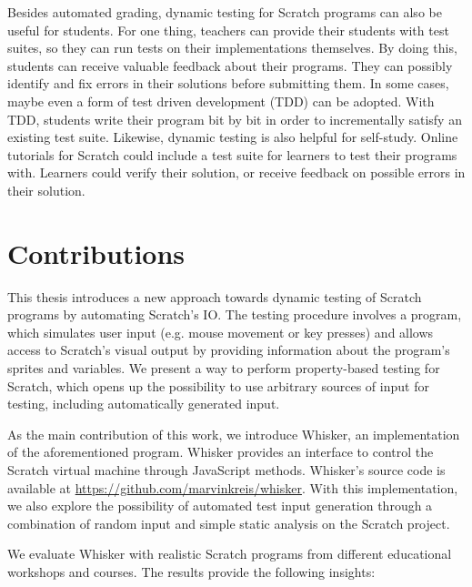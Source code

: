 Besides automated grading, dynamic testing for Scratch programs can also be useful for students.
For one thing, teachers can provide their students with test suites, so they can run tests on their implementations themselves.
By doing this, students can receive valuable feedback about their programs.
They can possibly identify and fix errors in their solutions before submitting them.
In some cases, maybe even a form of test driven development (TDD) can be adopted.
With TDD, students write their program bit by bit in order to incrementally satisfy an existing test suite.
Likewise, dynamic testing is also helpful for self-study.
Online tutorials for Scratch could include a test suite for learners to test their programs with.
Learners could verify their solution, or receive feedback on possible errors in their solution.

\section{Contributions}

This thesis introduces a new approach towards dynamic testing of Scratch programs by automating Scratch's IO.
The testing procedure involves a program, which simulates user input (e.g. mouse movement or key presses)
and allows access to Scratch's visual output by providing information about the program's sprites and variables.
We present a way to perform property-based testing \cite{quickcheck} for Scratch,
which opens up the possibility to use arbitrary sources of input for testing,
including automatically generated input.
\parspace

As the main contribution of this work, we introduce Whisker, an implementation of the aforementioned program.
Whisker provides an interface to control the Scratch virtual machine through JavaScript methods.
Whisker's source code is available at \url{https://github.com/marvinkreis/whisker}.
With this implementation, we also explore the possibility of automated test input generation through a combination of random input and simple static analysis on the Scratch project.
\parspace

We evaluate Whisker with realistic Scratch programs from different educational workshops and courses.
The results provide the following insights:

